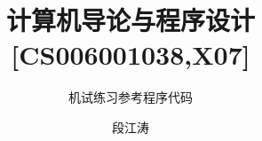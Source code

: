 \documentclass[graybox,envcountchap,sectrefs]{svmono}
\begin{document}
\author{段江涛}
\title{ 计算机导论与程序设计[CS006001038,X07]}
\subtitle{机试练习参考程序代码 }



\date{\zhtoday}

\maketitle  %



\tableofcontents   %




\end{document}
